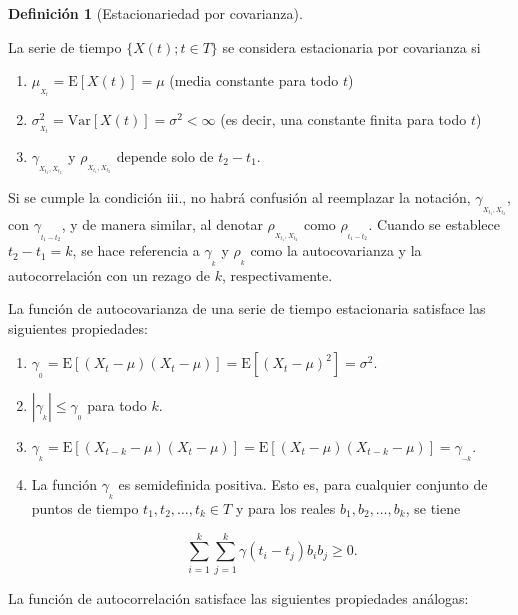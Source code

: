 \documentclass[
  us-letterpaper,
]{scrreprt}
\theoremstyle{plain}
\theoremstyle{definition}
\theoremstyle{plain}
\theoremstyle{definition}
\newtheorem{definition}{Definición}[chapter]
\theoremstyle{remark}
\begin{document}
\begin{definition}[Estacionariedad por
covarianza]\protect\hypertarget{def-estcov}{}\label{def-estcov}

La serie de tiempo \(\{X(t); t \in T\}\) se considera estacionaria por
covarianza si

\begin{enumerate}
\def\labelenumi{\roman{enumi}.}
\item
  \(\mu_{_{X_t}}=\mathrm E[X(t)] = \mu\) (media constante para todo
  \(t\))
\item
  \(\sigma^2_{_{X_t}}=\mathrm{Var}[X(t)] = \sigma^2 < \infty\) (es
  decir, una constante finita para todo \(t\))
\item
  \(\gamma_{_{X_{t_1},X_{t_2}}}\) y \(\rho_{_{X_{t_1},X_{t_2}}}\)
  depende solo de \(t_2 − t_1\).
\end{enumerate}

\end{definition}

Si se cumple la condición iii., no habrá confusión al reemplazar la
notación, \(\gamma_{_{X_{t_1},X_{t_2}}}\), con \(\gamma_{_{t_1-t_2}}\),
y de manera similar, al denotar \(\rho_{_{X_{t_1},X_{t_2}}}\) como
\(\rho_{_{t_1-t_2}}\). Cuando se establece \(t_2-t_1=k\), se hace
referencia a \(\gamma_{_k}\) y \(\rho_{_k}\) como la autocovarianza y la
autocorrelación con un rezago de \(k\), respectivamente.

La función de autocovarianza de una serie de tiempo estacionaria
satisface las siguientes propiedades:

\begin{enumerate}
\def\labelenumi{\roman{enumi}.}
\item
  \(\gamma_{_0}=\mathrm E[(X_{t}-\mu)(X_{t}-\mu)]=\mathrm E[(X_{t}-\mu)^2]=\sigma^2\).
\item
  \(|\gamma_{_k}|\leq \gamma_{_0}\) para todo \(k\).
\item
  \(\gamma_{_k}=\mathrm{E}[(X_{t-k}-\mu)(X_t-\mu)]=\mathrm{E}[(X_t-\mu)(X_{t-k}-\mu)]=\gamma_{_{-k}}\).
\item
  La función \(\gamma_{_k}\) es semidefinida positiva. Esto es, para
  cualquier conjunto de puntos de tiempo \(t_1, t_2,\ldots,t_k\in T\) y
  para los reales \(b_1,b_2,\ldots, b_k\), se tiene

  \[\sum_{i=1}^k \sum_{j=1}^k \gamma(t_i-t_j)b_i b_j\geq 0.
  \]
\end{enumerate}

La función de autocorrelación satisface las siguientes propiedades
análogas:
\end{document}
